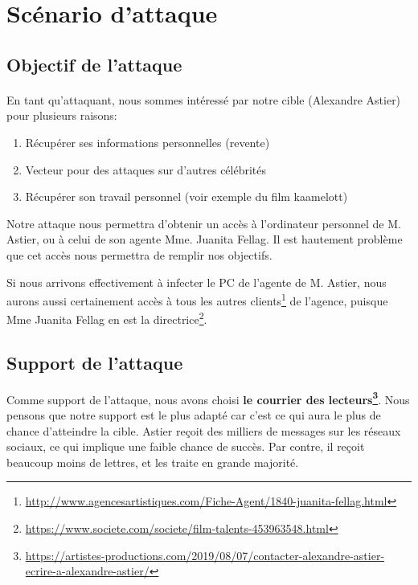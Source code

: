 \section{Scénario d'attaque}

\subsection{Objectif de l'attaque}
\paragraph{} En tant qu'attaquant, nous sommes intéressé par notre cible (Alexandre Astier) pour plusieurs raisons:
\begin{enumerate}
    \item Récupérer ses informations personnelles (revente)
    \item Vecteur pour des attaques sur d'autres célébrités
    \item Récupérer son travail personnel (voir exemple du film kaamelott)
\end{enumerate}

Notre attaque nous permettra d'obtenir un accès à l'ordinateur personnel de M. Astier, ou à celui de son agente Mme. Juanita Fellag.
Il est hautement problème que cet accès nous permettra de remplir nos objectifs.

Si nous arrivons effectivement à infecter le PC de l'agente de M. Astier, 
nous aurons aussi certainement accès à tous les autres clients\footnote{\url{http://www.agencesartistiques.com/Fiche-Agent/1840-juanita-fellag.html}} de l'agence, puisque Mme Juanita Fellag en est la directrice\footnote{\url{https://www.societe.com/societe/film-talents-453963548.html}}.

\subsection{Support de l'attaque}

Comme support de l'attaque, nous avons choisi \textbf{le courrier des lecteurs\footnote{\url{https://artistes-productions.com/2019/08/07/contacter-alexandre-astier-ecrire-a-alexandre-astier/}}}.
Nous pensons que notre support est le plus adapté car c'est ce qui aura le plus de chance d'atteindre la cible.
Astier reçoit des milliers de messages sur les réseaux sociaux, ce qui implique une faible chance de succès.
Par contre, il reçoit beaucoup moins de lettres, et les traite en grande majorité.


